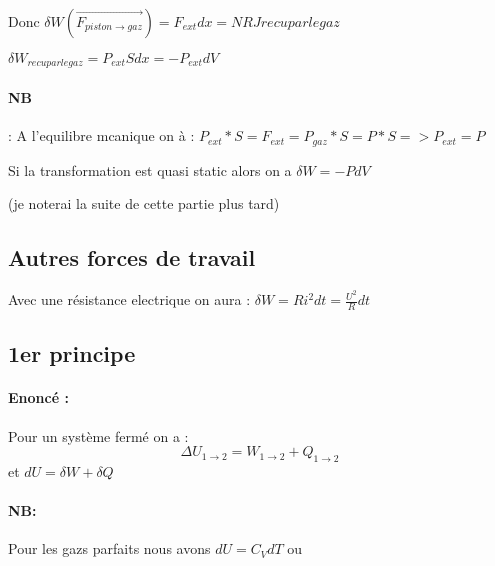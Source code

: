 \documentclass[a4paper,10pt]{report}
\begin{document}
Donc \begin{math}
      \delta W(\overrightarrow{F_{piston\rightarrow gaz}}) = F_{ext} dx = NRJ recu par le gaz
     \end{math}

\begin{math}
 \delta W_{recu par le gaz} = P_{ext} S dx = -P_{ext} dV
\end{math}
\paragraph{NB}: A l'equilibre mcanique on à :
\begin{math}
 P_{ext}* S = F_{ext} = P_{gaz}*S = P*S => P_{ext} = P
\end{math}

Si la transformation est quasi static alors on a \begin{math}
                                                  \delta W = -P dV
                                                 \end{math}

(je noterai la suite de cette partie plus tard)

\subsection{Autres forces de travail}
Avec une résistance electrique on aura :
\begin{math}
 \delta W = Ri^2dt=\frac{U^2}{R}dt
\end{math}
\subsection{1er principe}
\paragraph{Enoncé :}Pour un système fermé on a :
\begin{equation}
 \Delta U_{1\rightarrow2}= W_{1\rightarrow2} + Q_{1\rightarrow2}
\end{equation}
et \begin{math}
    d U = \delta W + \delta Q
   \end{math}
\paragraph{NB:}
Pour les gazs parfaits nous avons \begin{math}
                                   dU=C_VdT
                                  \end{math}
ou 
\end{document}
